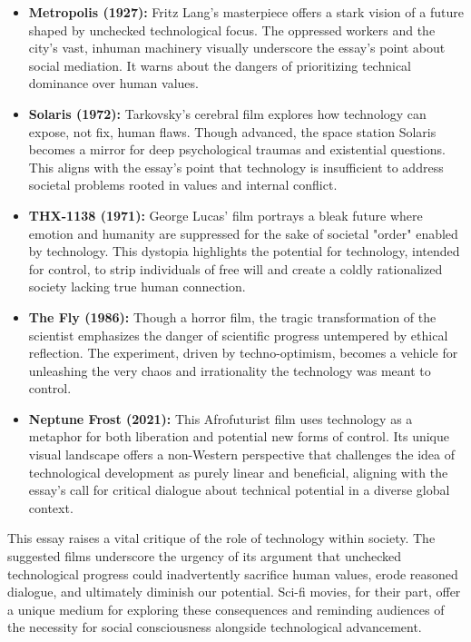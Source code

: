 \documentclass[11pt,fleqn]{book} %
\begin{document}
\begin{itemize}
\item \textbf{Metropolis (1927):}  Fritz Lang's masterpiece offers a stark vision of a future shaped by unchecked technological focus.  The oppressed workers and the city's vast, inhuman machinery visually underscore the essay's point about social mediation. It warns about the dangers of prioritizing technical dominance over human values.

\item \textbf{Solaris (1972):}  Tarkovsky's cerebral film explores how technology can expose, not fix, human flaws. Though advanced, the space station Solaris becomes a mirror for deep psychological traumas and existential questions. This aligns with the essay's point that technology is insufficient to address societal problems rooted in values and internal conflict. 

\item \textbf{THX-1138 (1971):} George Lucas' film portrays a bleak future where emotion and humanity are suppressed for the sake of societal "order" enabled by technology. This dystopia highlights the potential for technology, intended for control, to strip individuals of free will and create a coldly rationalized society lacking true human connection. 

\item \textbf{The Fly (1986):}  Though a horror film, the tragic transformation of the scientist emphasizes the danger of scientific progress untempered by ethical reflection. The experiment, driven by techno-optimism, becomes a vehicle for unleashing the very chaos and irrationality the technology was meant to control.

\item \textbf{Neptune Frost (2021):}  This Afrofuturist film uses technology as a metaphor for both liberation and potential new forms of control. Its unique visual landscape offers a non-Western perspective that challenges the idea of technological development as purely linear and beneficial, aligning with the essay's call for critical dialogue about technical potential in a diverse global context. 
\end{itemize}

\vspace{5pt}

This essay raises a vital critique of the role of technology within society. The suggested films underscore the urgency of its argument that unchecked technological progress could inadvertently sacrifice human values, erode reasoned dialogue, and ultimately diminish our potential. Sci-fi movies, for their part, offer a unique medium for exploring these consequences and reminding audiences of the necessity for social consciousness alongside technological advancement. 
\end{document}

